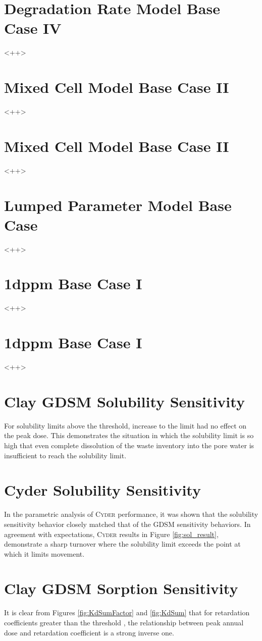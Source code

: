 \documentclass[letterpaper]{article}
\newcommand{\Cyder}{\textsc{Cyder}\xspace}
\begin{document}
{\section{Degradation Rate Model Base Case IV}
<++>
\section{Mixed Cell Model Base Case  II}
<++>
\section{Mixed Cell Model Base Case  II}
<++>
\section{Lumped Parameter Model Base Case}
<++>
\section{1dppm Base Case I}
<++>
\section{1dppm Base Case I}
<++>
\section{Clay GDSM Solubility Sensitivity}
For solubility limits above the threshold, increase to the limit had no effect on the peak dose. This demonstrates the 
situation in which the solubility limit is so high that even complete 
dissolution of the waste inventory into the pore water is insufficient to reach 
the solubility limit.
\section{Cyder Solubility Sensitivity}
In the parametric analysis of \Cyder performance, it was shown that the 
solubility sensitivity behavior closely matched that of the GDSM 
sensitivity behaviors. In agreement with expectations, \Cyder results in Figure 
\ref{fig:sol_result}, demonstrate a sharp turnover 
where the solubility limit exceeds the point at which it limits movement. 

\section{Clay GDSM Sorption Sensitivity}
It is clear from Figures \ref{fig:KdSumFactor} and \ref{fig:KdSum} that 
for retardation coefficients greater than the threshold , the 
relationship between peak annual dose and retardation coefficient is a strong 
inverse one. 
}
\end{document}
